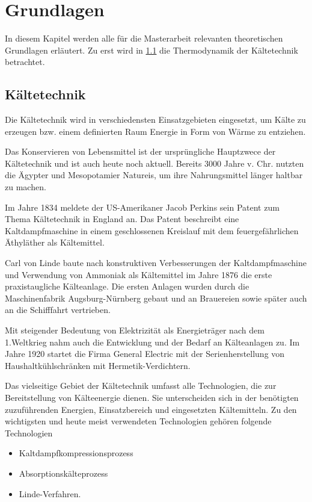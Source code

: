 \chapter{Grundlagen}
\label{cha:Grundlagen}

In diesem Kapitel werden alle für die Masterarbeit relevanten theoretischen Grundlagen erläutert. 
Zu erst wird in \ref{sec:Kaeltetechnik} die Thermodynamik der Kältetechnik betrachtet. 

\section{Kältetechnik}
\label{sec:Kaeltetechnik}

Die Kältetechnik wird in verschiedensten Einsatzgebieten eingesetzt, um Kälte zu erzeugen bzw. einem definierten Raum Energie in Form von Wärme zu entziehen. 

Das Konservieren von Lebensmittel ist  der ursprüngliche Hauptzwece der Kältetechnik und ist auch heute noch aktuell. Bereits 3000 Jahre v. Chr. nutzten die Ägypter und Mesopotamier Natureis, um ihre Nahrungsmittel länger haltbar zu machen.\citep{Danfoss2006}

Im Jahre 1834 meldete der US-Amerikaner Jacob Perkins sein Patent zum Thema Kältetechnik in England an. Das Patent beschreibt eine Kaltdampfmaschine in einem geschlossenen Kreislauf mit dem feuergefährlichen Äthyläther als Kältemittel.\citep{Siemens2007}

Carl von Linde baute nach konstruktiven Verbesserungen der Kaltdampfmaschine und Verwendung von Ammoniak als Kältemittel im Jahre 1876 die erste praxistaugliche Kälteanlage. Die ersten Anlagen wurden durch die Maschinenfabrik Augsburg-Nürnberg gebaut und an Brauereien sowie später auch an die Schifffahrt vertrieben.

Mit steigender Bedeutung von Elektrizität als Energieträger nach dem 1.Weltkrieg nahm auch die Entwicklung und der Bedarf an Kälteanlagen zu. Im Jahre 1920 startet die Firma General Electric mit der Serienherstellung von Haushaltkühlschränken mit Hermetik-Verdichtern.

Das vielseitige Gebiet der Kältetechnik umfasst alle Technologien, die zur Bereitstellung von Kälteenergie dienen. Sie unterscheiden sich in der benötigten zuzuführenden Energien, Einsatzbereich und eingesetzten Kältemitteln.  Zu den wichtigsten und heute meist verwendeten Technologien gehören folgende Technologien

\begin{itemize}

\item Kaltdampfkompressionsprozess
\item Absorptionskälteprozess
\item Linde-Verfahren.

\end{itemize}

